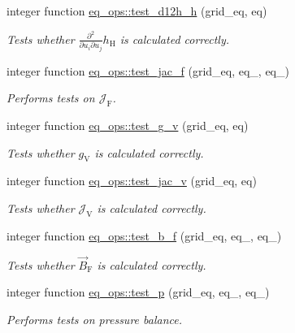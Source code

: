 \begin{DoxyCompactItemize}
integer function \hyperlink{namespaceeq__ops_a003df1e1ab90dc6f586c3eed3dd067e8}{eq\+\_\+ops\+::test\+\_\+d12h\+\_\+h} (grid\+\_\+eq, eq)
\begin{DoxyCompactList}\small\item\em Tests whether $ \frac{\partial^2}{\partial u_i \partial u_j} h_\text{H} $ is calculated correctly. \end{DoxyCompactList}\item 
integer function \hyperlink{namespaceeq__ops_a05dcd4803b9c7845d3353614c9630c23}{eq\+\_\+ops\+::test\+\_\+jac\+\_\+f} (grid\+\_\+eq, eq\+\_, eq\+\_)
\begin{DoxyCompactList}\small\item\em Performs tests on $ \mathcal{J}_\text{F}$. \end{DoxyCompactList}\item 
integer function \hyperlink{namespaceeq__ops_a9811c83477d9d85f7401fd7957a590fc}{eq\+\_\+ops\+::test\+\_\+g\+\_\+v} (grid\+\_\+eq, eq)
\begin{DoxyCompactList}\small\item\em Tests whether $g_\text{V}$ is calculated correctly. \end{DoxyCompactList}\item 
integer function \hyperlink{namespaceeq__ops_aef40d04e93f6a96576f8fe893fb086f8}{eq\+\_\+ops\+::test\+\_\+jac\+\_\+v} (grid\+\_\+eq, eq)
\begin{DoxyCompactList}\small\item\em Tests whether $\mathcal{J}_\text{V}$ is calculated correctly. \end{DoxyCompactList}\item 
integer function \hyperlink{namespaceeq__ops_a8082c12510696bd8ffdd0deef41860c2}{eq\+\_\+ops\+::test\+\_\+b\+\_\+f} (grid\+\_\+eq, eq\+\_, eq\+\_)
\begin{DoxyCompactList}\small\item\em Tests whether $\vec{B}_\text{F}$ is calculated correctly. \end{DoxyCompactList}\item 
integer function \hyperlink{namespaceeq__ops_a38b723f6ed5d2e2772c9c3ad14d5ffd4}{eq\+\_\+ops\+::test\+\_\+p} (grid\+\_\+eq, eq\+\_, eq\+\_)
\begin{DoxyCompactList}\small\item\em Performs tests on pressure balance. \end{DoxyCompactList}\end{DoxyCompactItemize}

